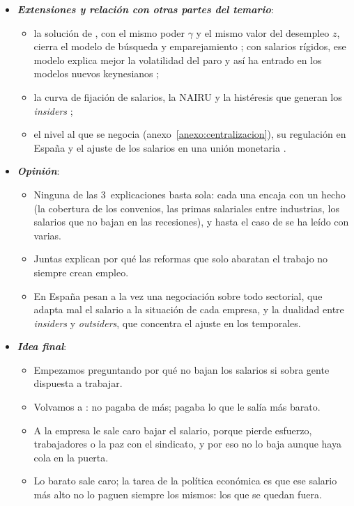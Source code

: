 \documentclass[11pt]{article}
\begin{document}
\begin{itemize}
\item \textbf{\emph{Extensiones y relación con otras partes del temario}}:
  \begin{itemize}
  \item la solución de , con el mismo poder $\gamma$ y el mismo valor del desempleo $z$, cierra el modelo de búsqueda y emparejamiento ; con salarios rígidos, ese modelo explica mejor la volatilidad del paro\nocite{Hall2005Employment} y así ha entrado en los modelos nuevos keynesianos\nocite{BlanchardGali2010Labor} ;
  \item la curva de fijación de salarios, la NAIRU y la histéresis que generan los \emph{insiders} ;
  \item el nivel al que se negocia (anexo~\ref{anexo:centralizacion}), su regulación en España  y el ajuste de los salarios en una unión monetaria .
  \end{itemize}

\item \textbf{\emph{Opinión}}:
  \begin{itemize}
  \item Ninguna de las 3~explicaciones basta sola: cada una encaja con un hecho (la cobertura de los convenios, las primas salariales entre industrias, los salarios que no bajan en las recesiones), y hasta el caso de  se ha leído con varias\nocite{RaffSummers1987Ford,Raff1988Wage}.

  \item Juntas explican por qué las reformas que solo abaratan el trabajo no siempre crean empleo.

  \item En España pesan a la vez una negociación sobre todo sectorial, que adapta mal el salario a la situación de cada empresa, y la dualidad entre \emph{insiders} y \emph{outsiders}, que concentra el ajuste en los temporales\nocite{JimenoThomas2013Collective,BentolilaEtAl2012Two}.
  \end{itemize}

\item \textbf{\emph{Idea final}}:
  \begin{itemize}
  \item Empezamos preguntando por qué no bajan los salarios si sobra gente dispuesta a trabajar.

  \item Volvamos a : no pagaba de más; pagaba lo que le salía más barato.

  \item A la empresa le sale caro bajar el salario, porque pierde esfuerzo, trabajadores o la paz con el sindicato, y por eso no lo baja aunque haya cola en la puerta.

  \item Lo barato sale caro; la tarea de la política económica es que ese salario más alto no lo paguen siempre los mismos: los que se quedan fuera.
  \end{itemize}
\end{itemize}
\end{document}

